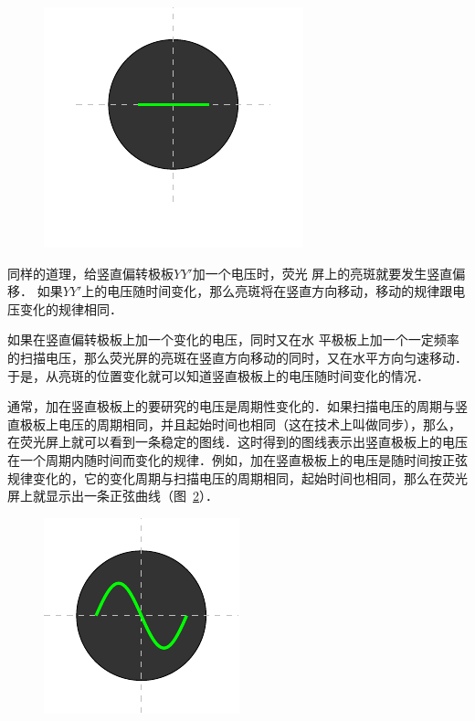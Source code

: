 \begin{figure}[htbp]
    \hfill
    \begin{minipage}[b]{0.28\textwidth}
        \centering
        \includegraphics{fig/B/8-16.pdf}
        \caption{}\label{fig_B_8-16}
    \end{minipage}
\end{figure}

同样的道理，给竖直偏转极板$YY'$加一个电压时，荧光
屏上的亮斑就要发生竖直偏移．
如果$YY'$上的电压随时间变化，那么亮斑将在竖直方向移动，移动的规律跟电压变化的规律相同．

如果在竖直偏转极板上加一个变化的电压，同时又在水
平极板上加一个一定频率的扫描电压，那么荧光屏的亮斑在竖直方向移动的同时，又在水平方向匀速移动．于是，从亮斑的位置变化就可以知道竖直极板上的电压随时间变化的情况．

通常，加在竖直极板上的要研究的电压是周期性变化的．如果扫描电压的周期与竖直极板上电压的周期相同，并且起始时间也相同（这在技术上叫做同步），那么，在荧光屏上就可以看到一条稳定的图线．这时得到的图线表示出竖直极板上的电压在一个周期内随时间而变化的规律．例如，加在竖直极板上的电压是随时间按正弦规律变化的，它的变化周期与扫描电压的周期相同，起始时间也相同，那么在荧光屏上就显示出一条正弦曲线（图~\ref{fig_B_8-17}）．
\begin{figure}[htbp]
    \centering
    \includegraphics{fig/B/8-17.pdf}
    \caption{}\label{fig_B_8-17}
\end{figure}

